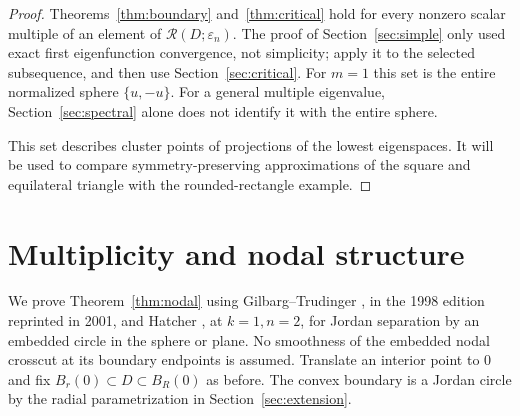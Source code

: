 \documentclass[11pt]{article}
\theoremstyle{definition}
\theoremstyle{remark}
\numberwithin{equation}{section}
\begin{document}
\begin{proof}
Theorems~\ref{thm:boundary} and~\ref{thm:critical} hold for every nonzero scalar multiple of an element of $\mathcal R(D;\varepsilon_n)$. The proof of Section~\ref{sec:simple} only used exact first eigenfunction convergence, not simplicity; apply it to the selected subsequence, and then use Section~\ref{sec:critical}. For $m=1$ this set is the entire normalized sphere $\{u,-u\}$. For a general multiple eigenvalue, Section~\ref{sec:spectral} alone does not identify it with the entire sphere.

This set describes cluster points of projections of the lowest eigenspaces. It will be used to compare symmetry-preserving approximations of the square and equilateral triangle with the rounded-rectangle example.
\end{proof}


\section{Multiplicity and nodal structure}\label{sec:multiplicity}
We prove Theorem~\ref{thm:nodal} using Gilbarg--Trudinger \cite[Theorem~8.18, p.~194, with conditions (8.5),(8.6), pp.~177--178]{GT}, in the 1998 edition reprinted in 2001, and Hatcher \cite[Proposition~2B.1(b), p.~169]{HatcherAT}, at $k=1,n=2$, for Jordan separation by an embedded circle in the sphere or plane. No smoothness of the embedded nodal crosscut at its boundary endpoints is assumed. Translate an interior point to $0$ and fix $B_r(0)\subset D\subset B_R(0)$ as before. The convex boundary is a Jordan circle by the radial parametrization in Section~\ref{sec:extension}.
\end{document}
